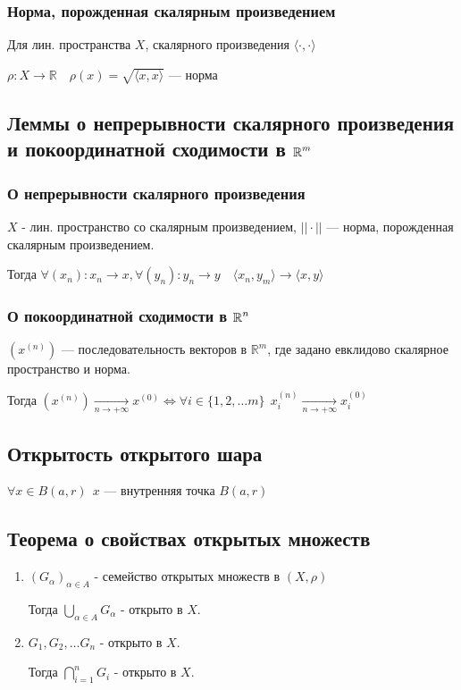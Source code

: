 \subsubsection{Норма, порожденная скалярным произведением}
Для лин. пространства $X$, скалярного произведения $\langle \cdot ,\cdot \rangle$

$\rho:X\to\mathbb{R} \quad \rho(x)=\sqrt{\langle x,x\rangle}$ --- норма

\subsection{Леммы о непрерывности скалярного произведения и покоординатной сходимости в $\operatorname*{\mathbb{R}}^m$}

\subsubsection{О непрерывности скалярного произведения}

$X$ - лин. пространство со скалярным произведением, $||\cdot||$ --- норма, порожденная скалярным произведением.

Тогда $\forall (x_n) : x_n\to x, \forall (y_n) : y_n\to y \quad \langle x_n,y_m\rangle\to\langle x,y\rangle$

\subsubsection{О покоординатной сходимости в $\operatorname*{\mathbb{R}}^n$}

$(x^{(n)})$ --- последовательность векторов в $\mathbb{R}^m$, где задано евклидово скалярное пространство и норма.

Тогда $(x^{(n)})\underset{n\to+\infty}\to x^{(0)} \Leftrightarrow \forall i\in\{1,2,\ldots m\} \ \ x_i^{(n)}\underset{n\to+\infty}\to x_i^{(0)}$

\subsection{Открытость открытого шара}

$\forall x \in B(a, r) \ \ x$ --- внутренняя точка $B(a, r)$

\subsection{Теорема о свойствах открытых множеств}

\begin{enumerate}
    \item $(G_\alpha)_{\alpha\in A}$ - семейство открытых множеств в $(X,\rho)$
    
    Тогда $\bigcup\limits_{\alpha\in A} G_\alpha$ - открыто в $X$.

    \item $G_1,G_2,\ldots G_n$ - открыто в $X$.
    
    Тогда $\bigcap\limits_{i=1}^{n} G_i$ - открыто в $X$.
\end{enumerate}

